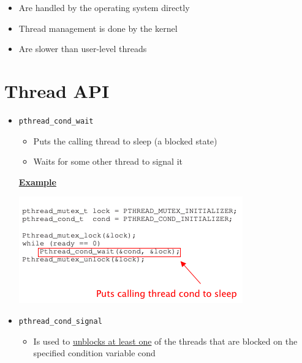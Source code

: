 \documentclass[12pt]{article}
\begin{document}
\begin{itemize}
\begin{itemize}
        \begin{itemize}
            \item Are handled by the operating system directly
            \item Thread management is done by the kernel
            \item Are slower than user-level threads
        \end{itemize}
    \end{itemize}
\end{itemize}

\section{Thread API}

\begin{itemize}

    \item \texttt{pthread\_cond\_wait}

    \begin{itemize}
        \item Puts the calling thread to sleep (a blocked state)
        \item Waits for some other thread to signal it
    \end{itemize}

    \bigskip

    \underline{\textbf{Example}}

    \begin{center}
    \includegraphics[width=0.7\linewidth]{images/midterm_2_solution_9.png}
    \end{center}

    \item \texttt{pthread\_cond\_signal}

    \begin{itemize}
        \item Is used to \underline{unblocks at least one} of the threads that
        are blocked on the specified condition variable cond
    \end{itemize}


\end{itemize}
\end{document}
